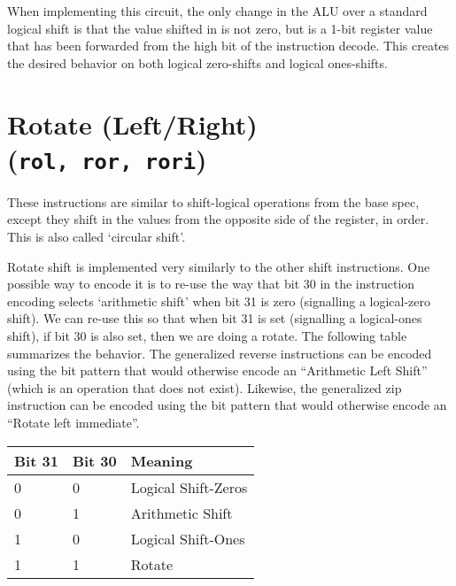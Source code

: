 When implementing this circuit, the only change in the ALU over a
standard logical shift is that the value shifted in is not zero, but is
a 1-bit register value that has been forwarded from the high bit of the
instruction decode. This creates the desired behavior on both logical
zero-shifts and logical ones-shifts.


\section{Rotate (Left/Right) (\texttt{rol,\ ror,\ rori})}

These instructions are similar to shift-logical operations from the base
spec, except they shift in the values from the opposite side of the
register, in order. This is also called `circular shift'.





Rotate shift is implemented very similarly to the other shift
instructions. One possible way to encode it is to re-use the way that
bit 30 in the instruction encoding selects `arithmetic shift' when bit
31 is zero (signalling a logical-zero shift). We can re-use this so that
when bit 31 is set (signalling a logical-ones shift), if bit 30 is also
set, then we are doing a rotate. The following table summarizes the
behavior. The generalized reverse instructions can be encoded using the
bit pattern that would otherwise encode an ``Arithmetic Left Shift''
(which is an operation that does not exist). Likewise, the generalized zip
instruction can be encoded using the bit pattern that would otherwise
encode an ``Rotate left immediate''.

\begin{center}
\begin{tabular}{lll}
Bit 31 & Bit 30 & Meaning \\
\hline
0 & 0 & Logical Shift-Zeros \\
0 & 1 & Arithmetic Shift \\
1 & 0 & Logical Shift-Ones \\
1 & 1 & Rotate \\
\end{tabular}
\end{center}


